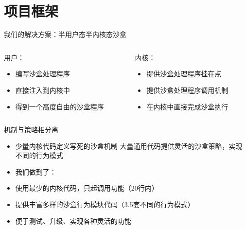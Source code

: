 \documentclass[UTF8,fontset=macnew,xcolor=table]{ctexbeamer}
\begin{document}
\section{项目框架}
\begin{frame}{我们的解决方案：半用户态半内核态沙盒}
    \begin{columns}
        \begin{column}{0.5\textwidth}
            \begin{block}{用户：}
            \begin{itemize}
                \item 编写沙盒处理程序
                \item 直接注入到内核中
                \item 得到一个高度自由的沙盒程序
            \end{itemize}
            \end{block}
        \end{column}

        \begin{column}{0.5\textwidth}
            \begin{block}{内核：}
                \begin{itemize}
                    \item 提供沙盒处理程序挂在点
                    \item 提供沙盒处理程序调用机制
                    \item 在内核中直接完成沙盒执行
                \end{itemize}
                \end{block}
        \end{column}
    \end{columns}
\end{frame}

\begin{frame}{机制与策略相分离}

    \begin{itemize}
        \item 少量内核代码定义写死的沙盒机制
        大量通用代码提供灵活的沙盒策略，实现不同的行为模式\\
        
        \item 我们做到了：
        \item 使用最少的内核代码，只起调用功能（20行内）
        \item 提供丰富多样的沙盒行为模块代码（3.5套不同的行为模式）
        \item 便于测试、升级、实现各种灵活的功能
    \end{itemize}
    
\end{frame}
\end{document}
